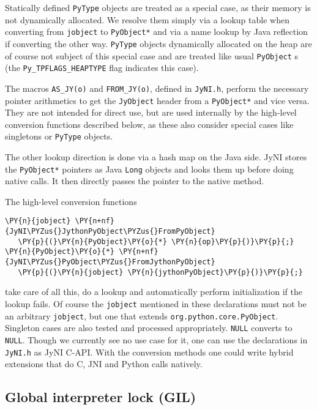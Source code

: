 \documentclass[letterpaper,compsoc,twoside]{IEEEtran}
\makeatletter
\def\PY@reset{\let\PY@it=\relax \let\PY@bf=\relax \let\PY@ul=\relax \let\PY@tc=\relax \let\PY@bc=\relax \let\PY@ff=\relax}
\def\PY@tok#1{\csname PY@tok@#1\endcsname}
\def\PY@toks#1+{\ifx\relax#1\empty\else \PY@tok{#1}\expandafter\PY@toks\fi}
\def\PY@do#1{\PY@bc{\PY@tc{\PY@ul{\PY@it{\PY@bf{\PY@ff{#1}}}}}}}
\def\PY#1#2{\PY@reset\PY@toks#1+\relax+\PY@do{#2}}
\def\PYZus{\char`\_}
\makeatother
\begin{document}
Statically defined \texttt{PyType} objects are treated as a special case, as their memory is not dynamically allocated. We resolve them simply via a lookup table when converting from \texttt{jobject} to \texttt{PyObject*} and via a name lookup by Java reflection if converting the other way. \texttt{PyType} objects dynamically allocated on the heap are of course not subject of this special case and are treated like usual \texttt{PyObject} s (the \texttt{Py\_TPFLAGS\_HEAPTYPE} flag indicates this case).

The macros \texttt{AS\_JY(o)} and \texttt{FROM\_JY(o)}, defined in \texttt{JyNI.h}, perform the necessary pointer arithmetics to get the \texttt{JyObject} header from a \texttt{PyObject*} and vice versa. They are not intended for direct use, but are used internally by the high-level conversion functions described below, as these also consider special cases like singletons or \texttt{PyType} objects.

The other lookup direction is done via a hash map on the Java side. JyNI stores the \texttt{PyObject*} pointers as Java \texttt{Long} objects and looks them up before doing native calls. It then directly passes the pointer to the native method.

The high-level conversion functions\begin{Verbatim}[commandchars=\\\{\},fontsize=\footnotesize]
\PY{n}{jobject} \PY{n+nf}{JyNI\PYZus{}JythonPyObject\PYZus{}FromPyObject}
   \PY{p}{(}\PY{n}{PyObject}\PY{o}{*} \PY{n}{op}\PY{p}{)}\PY{p}{;}
\PY{n}{PyObject}\PY{o}{*} \PY{n+nf}{JyNI\PYZus{}PyObject\PYZus{}FromJythonPyObject}
   \PY{p}{(}\PY{n}{jobject} \PY{n}{jythonPyObject}\PY{p}{)}\PY{p}{;}
\end{Verbatim}
take care of all this, do a lookup and automatically perform initialization if the lookup fails.
Of course the \texttt{jobject} mentioned in these declarations must not be an arbitrary \texttt{jobject}, but one that extends \texttt{org.python.core.PyObject}.
Singleton cases are also tested and processed appropriately. \texttt{NULL} converts to \texttt{NULL}.
Though we currently see no use case for it, one can use the declarations in \texttt{JyNI.h} as JyNI C-API. With the conversion methods one could write hybrid extensions that do C, JNI and Python calls natively.

\subsection{Global interpreter lock (GIL)\label{global-interpreter-lock-gil}}
\end{document}
